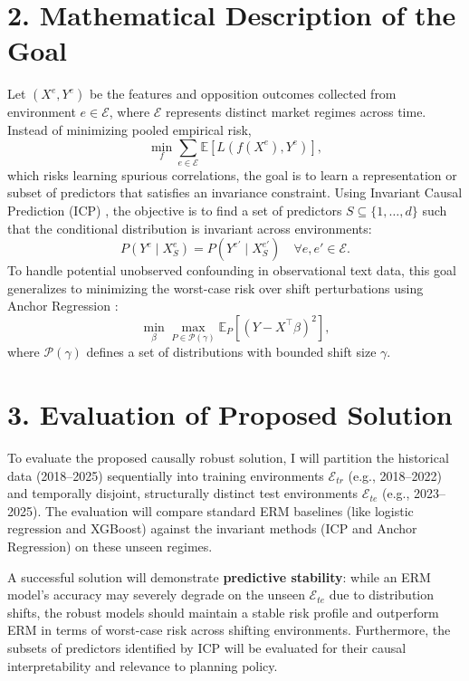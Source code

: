 \documentclass[11pt]{article}
\begin{document}
\section*{2. Mathematical Description of the Goal}
Let $(X^e, Y^e)$ be the features and opposition outcomes collected from environment $e \in \mathcal{E}$, where $\mathcal{E}$ represents distinct market regimes across time. Instead of minimizing pooled empirical risk,
\[ \min_f \sum_{e \in \mathcal{E}} \mathbb{E}[L(f(X^e), Y^e)], \]
which risks learning spurious correlations, the goal is to learn a representation or subset of predictors that satisfies an invariance constraint. Using Invariant Causal Prediction (ICP) \citep{peters2016icp}, the objective is to find a set of predictors $S \subseteq \{1, \dots, d\}$ such that the conditional distribution is invariant across environments:
$$ P(Y^e \mid X_S^e) = P(Y^{e'} \mid X_S^{e'}) \quad \forall e, e' \in \mathcal{E}. $$
To handle potential unobserved confounding in observational text data, this goal generalizes to minimizing the worst-case risk over shift perturbations using Anchor Regression \citep{buhlmann2020invariance}:
$$ \min_{\beta} \max_{P \in \mathcal{P}(\gamma)} \mathbb{E}_P \left[ (Y - X^\top \beta)^2 \right], $$
where $\mathcal{P}(\gamma)$ defines a set of distributions with bounded shift size $\gamma$.

\section*{3. Evaluation of Proposed Solution}
To evaluate the proposed causally robust solution, I will partition the historical data (2018--2025) sequentially into training environments $\mathcal{E}_{tr}$ (e.g., 2018--2022) and temporally disjoint, structurally distinct test environments $\mathcal{E}_{te}$ (e.g., 2023--2025). The evaluation will compare standard ERM baselines (like logistic regression and XGBoost) against the invariant methods (ICP and Anchor Regression) on these unseen regimes.

A successful solution will demonstrate \textbf{predictive stability}: while an ERM model's accuracy may severely degrade on the unseen $\mathcal{E}_{te}$ due to distribution shifts, the robust models should maintain a stable risk profile and outperform ERM in terms of worst-case risk across shifting environments. Furthermore, the subsets of predictors identified by ICP will be evaluated for their causal interpretability and relevance to planning policy.

\vspace{-0.5em}
{\scriptsize\setlength{\bibsep}{0pt}


}
\end{document}
